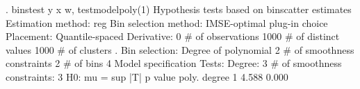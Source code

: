 . binstest y x w, testmodelpoly(1)
{\smallskip}
Hypothesis tests based on binscatter estimates
Estimation method: reg
Bin selection method: IMSE-optimal plug-in choice
Placement: Quantile-spaced
Derivative: 0
{\smallskip}
\# of observations             {\VBAR}    1000
\# of distinct values          {\VBAR}    1000
\# of clusters                 {\VBAR}       .
Bin selection:                {\VBAR} 
         Degree of polynomial {\VBAR}       2
  \# of smoothness constraints {\VBAR}       2
                    \# of bins {\VBAR}       4
{\smallskip}
Model specification Tests:
Degree: 3     \# of smoothness constraints: 3
{\smallskip}
H0: mu =           {\VBAR} sup |T|           p value
poly. degree  1    {\VBAR}   4.588             0.000
